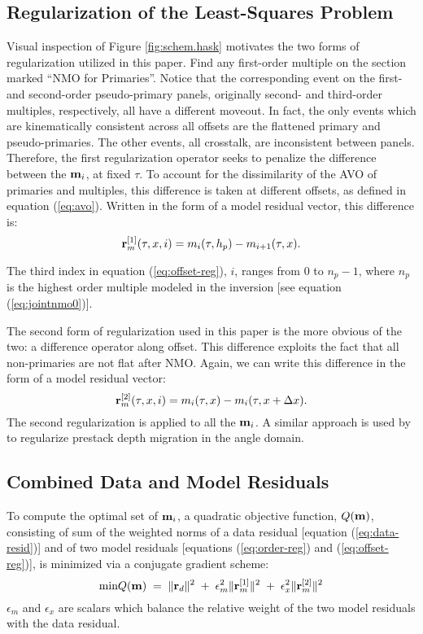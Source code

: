 \subsection{Regularization of the Least-Squares Problem}
Visual inspection of Figure \ref{fig:schem.hask} motivates the two forms of 
regularization utilized in this paper.  Find any first-order multiple on the section marked 
``NMO for Primaries''.  Notice that the corresponding event on the first- and second-order 
pseudo-primary panels, originally second- and third-order multiples, respectively, all have 
a different moveout.  In fact, the only events which are kinematically consistent across all 
offsets are the flattened primary and pseudo-primaries.  The other events, all crosstalk, are
inconsistent between panels.  Therefore, the first regularization 
operator seeks to penalize the difference between the $\bold m_i$, at fixed $\tau$.  To account
for the dissimilarity of the AVO of primaries and multiples, this difference is taken at 
different offsets, as defined in equation (\ref{eq:avo}).  Written in the form of a model 
residual vector, this difference is:
\begin{equation}
	\bold r_m^{[1]}(\tau,x,i) = m_i(\tau,h_p) - m_{i+1}(\tau,x). \label{eq:order-reg}
\end{equation}
\par
The third index in equation (\ref{eq:offset-reg}), $i$, ranges from 0 to $n_p-1$, where
$n_p$ is the highest order multiple modeled in the inversion [see equation (\ref{eq:jointnmo0})].
\par
The second form of regularization used in this paper is the more obvious of the two:
a difference operator along offset.  This difference exploits the fact that all 
non-primaries are not flat after NMO.  Again, we can write this difference in the form 
of a model residual vector:
\begin{equation}
	\bold r_m^{[2]}(\tau,x,i) = m_i(\tau,x) - m_i(\tau,x+\Delta x). \label{eq:offset-reg}
\end{equation}
The second regularization is applied to all the $\bold m_i$.  A similar approach is used 
by  to regularize prestack depth migration in the angle 
domain.

\subsection{Combined Data and Model Residuals}
To compute the optimal set of $\bold m_i$, a quadratic objective function, $Q(\bf m)$, 
consisting of sum of the weighted norms of a data residual [equation (\ref{eq:data-resid})] and 
of two model residuals [equations (\ref{eq:order-reg}) and (\ref{eq:offset-reg})], is 
minimized via a conjugate gradient scheme:  
\begin{equation}
	\mbox{min} Q(\bold m) \; = \; \| \bold r_d \|^2 \; + \; \epsilon_m^2 \| \bold r_m^{[1]} \|^2
	                       \; + \; \epsilon_x^2 \| \bold r_m^{[2]} \|^2  \label{eq:all-resid}
\end{equation}
$\epsilon_m$ and $\epsilon_x$ are scalars which balance the relative weight of the two model 
residuals with the data residual.

